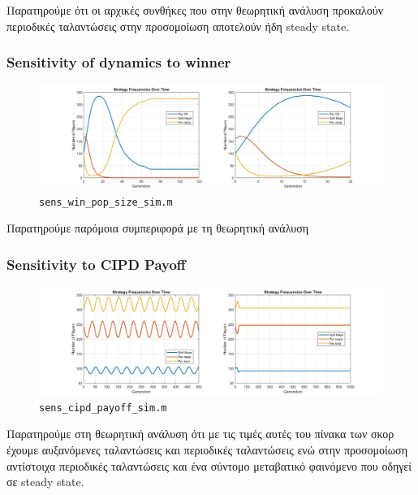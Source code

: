 Παρατηρούμε ότι οι αρχικές συνθήκες που στην θεωρητική ανάλυση προκαλούν περιοδικές ταλαντώσεις στην προσομοίωση αποτελούν ήδη steady state.\clearpage
\subsubsection{Sensitivity of dynamics to winner}
\begin{figure}[th!]
\centering
\includegraphics[width=1\linewidth]{fit_plots_simulations/sensitivity_of_winner_to_popsize_sim}
\caption{\texttt{sens\_win\_pop\_size\_sim.m}}
\label{fig:sensitivityofwinnertopopsizesim}
\end{figure}

Παρατηρούμε παρόμοια συμπεριφορά με τη θεωρητική ανάλυση

\subsubsection{Sensitivity to CIPD Payoff}




\begin{figure}[th!]
\centering
\includegraphics[width=1\linewidth]{fit_plots_simulations/sensitivity_to_cipd_payoff_sim}
\caption{\texttt{sens\_cipd\_payoff\_sim.m}}
\label{fig:sensitivitytocipdpayoffsim}
\end{figure}
Παρατηρούμε στη θεωρητική ανάλυση ότι με τις τιμές αυτές του πίνακα των σκορ έχουμε αυξανόμενες ταλαντώσεις και περιοδικές ταλαντώσεις ενώ στην προσομοίωση αντίστοιχα περιοδικές ταλαντώσεις και ένα σύντομο μεταβατικό φαινόμενο που οδηγεί σε steady state. 
